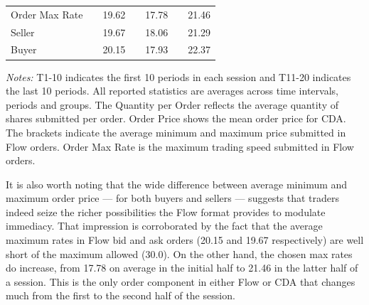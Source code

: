 \begin{table}
{\begin{threeparttable}
\begin{tabular}{lcccccc}
    \\
     Order Max Rate                 &           & 19.62         &           & 17.78         &           & 21.46         \\
     \hspace{3mm}Seller             &           & 19.67         &           & 18.06         &           & 21.29         \\
     \hspace{3mm}Buyer              &           & 20.15         &           & 17.93         &           & 22.37         \\
    \bottomrule
    \end{tabular}
    \begin{tablenotes}
    \item \small \textit{Notes:} 
T1-10 indicates the first 10 periods in each session and T11-20 indicates the last 10 periods.
All reported statistics are averages across time intervals, periods and groups.
The Quantity per Order reflects the average quantity of shares submitted per order.
    Order Price shows the mean order price for CDA. The brackets indicate the average minimum and maximum price submitted in Flow orders. Order Max Rate is the maximum trading speed submitted in Flow orders. 
    \end{tablenotes}
    \end{threeparttable}
    }
    \label{tab:summary_stat_trader}
\end{table}

It is also worth noting that the wide difference between average minimum and maximum order price --- for both buyers and sellers --- suggests that traders indeed seize the richer possibilities the Flow format  provides to modulate immediacy.  
That impression is corroborated by the fact that the average maximum rates in Flow bid and ask orders (20.15 and 19.67 respectively)
are well short of the maximum allowed (30.0).
On the other hand, the chosen max rates do increase, from 17.78 on average in the initial half to 21.46 in the latter half of a session. This is the only order component in either Flow or CDA that changes much from the first to the second half of the session. 


